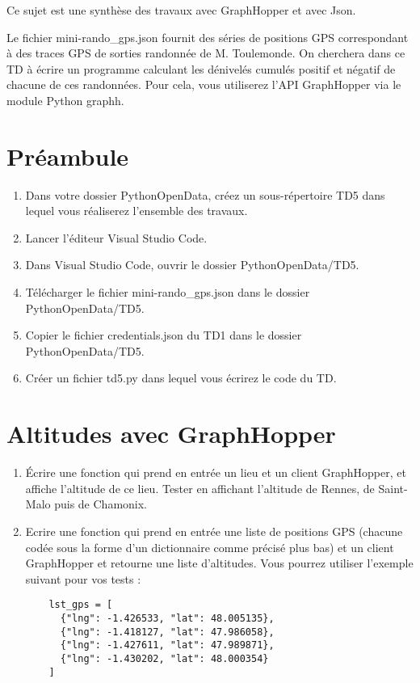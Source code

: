 \documentclass[11pt,a4paper]{article}
\begin{document}
Ce sujet est une synthèse des travaux avec GraphHopper et avec Json. 

Le fichier mini-rando\_gps.json fournit des séries de positions GPS correspondant à des traces GPS de sorties randonnée de M. Toulemonde. On cherchera dans ce TD à écrire un programme calculant les dénivelés cumulés positif et négatif de chacune de ces randonnées. Pour cela, vous utiliserez l’API GraphHopper via le module Python graphh.

\section*{Préambule}
\begin{enumerate}
    \item Dans votre dossier PythonOpenData, créez un sous-répertoire TD5 dans lequel vous réaliserez l'ensemble des travaux.
    \item Lancer l'éditeur Visual Studio Code.
    \item Dans Visual Studio Code, ouvrir le dossier PythonOpenData/TD5. 
    \item Télécharger le fichier mini-rando\_gps.json dans le dossier PythonOpenData/TD5.
  \item Copier le fichier credentials.json du TD1 dans le dossier PythonOpenData/TD5.
  \item Créer un fichier td5.py dans lequel vous écrirez le code du TD. 
\end{enumerate}

\section{Altitudes avec GraphHopper}
\begin{enumerate}
    \item Écrire une fonction qui prend en entrée un lieu et un client GraphHopper, et affiche l'altitude de ce lieu.  Tester en affichant l'altitude de Rennes, de Saint-Malo puis de Chamonix.
    \item Ecrire une fonction qui prend en entrée une liste de positions GPS (chacune codée sous la forme d’un dictionnaire comme précisé plus bas) et un client GraphHopper et retourne une liste d’altitudes. Vous pourrez utiliser l’exemple suivant pour vos tests :
\begin{verbatim}
    lst_gps = [
      {"lng": -1.426533, "lat": 48.005135},
      {"lng": -1.418127, "lat": 47.986058},
      {"lng": -1.427611, "lat": 47.989871},
      {"lng": -1.430202, "lat": 48.000354}
    ]
\end{verbatim}
\end{enumerate}
\end{document}
